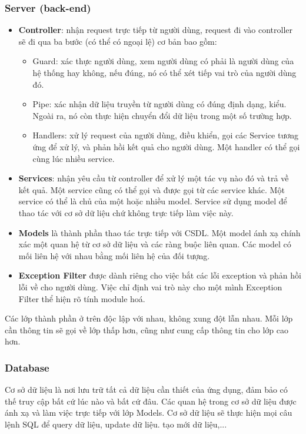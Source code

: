 \subsubsection{Server (back-end)}
\begin{itemize}
    \item \textbf{Controller}: nhận request trực tiếp từ người dùng, request đi vào controller sẽ đi qua ba bước (có thể có ngoại lệ) cơ bản bao gồm:
    \begin{itemize}
        \item Guard: xác thực người dùng, xem người dùng có phải là người dùng của hệ thống hay không, nếu đúng, nó có thể xét tiếp vai trò của người dùng đó.
        \item Pipe: xác nhận dữ liệu truyền từ người dùng có đúng định dạng, kiểu. Ngoài ra, nó còn thực hiện chuyển đổi dữ liệu trong một số trường hợp.
        \item Handlers: xử lý request của người dùng, điều khiển, gọi các Service tương ứng để xử lý, và phản hồi kết quả cho người dùng. Một handler có thể gọi cùng lúc nhiều service.
    \end{itemize}
    
    \item \textbf{Services}: nhận yêu cầu từ controller để xử lý một tác vụ nào đó và trả về kết quả. Một service cũng có thể gọi và được gọi từ các service khác. Một service có thể là chủ của một hoặc nhiều model. Service sử dụng model để thao tác với cơ sở dữ liệu chứ không trực tiếp làm việc này.
    
    \item \textbf{Models} là thành phần thao tác trực tiếp với CSDL. Một model ánh xạ chính xác một quan hệ từ cơ sở dữ liệu và các ràng buộc liên quan. Các model có mối liên hệ với nhau bằng mối liên hệ của đối tượng.
    
    \item \textbf{Exception Filter} được dành riêng cho việc bắt các lỗi exception và phản hồi lỗi về cho người dùng. Việc chỉ định vai trò này cho một mình Exception Filter thể hiện rõ tính module hoá.

\end{itemize}
Các lớp thành phần ở trên độc lập với nhau, không xung đột lẫn nhau. Mỗi lớp cần thông tin sẽ gọi về lớp thấp hơn, cũng như cung cấp thông tin cho lớp cao hơn.

\subsubsection{Database}
Cơ sở dữ liệu là nơi lưu trữ tất cả dữ liệu cần thiết của ứng dụng, đảm bảo có thế truy cập bất cứ lúc nào và bất cứ đâu. Các quan hệ trong cơ sở dữ liệu được ánh xạ và làm việc trực tiếp với lớp Models. Cơ sở dữ liệu sẽ thực hiện mọi câu lệnh SQL để query dữ liệu, update dữ liệu. tạo mới dữ liệu,...
